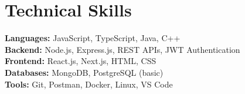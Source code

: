 \documentclass[9pt,a4paper]{article}
\begin{document}
\section*{Technical Skills}
\textbf{Languages:} JavaScript, TypeScript, Java, C++ \\
\textbf{Backend:} Node.js, Express.js, REST APIs, JWT Authentication \\
\textbf{Frontend:} React.js, Next.js, HTML, CSS \\
\textbf{Databases:} MongoDB, PostgreSQL (basic) \\
\textbf{Tools:} Git, Postman, Docker, Linux, VS Code
\end{document}
